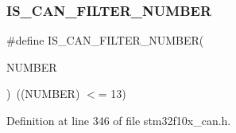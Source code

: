 \subsubsection{\texorpdfstring{I\+S\+\_\+\+C\+A\+N\+\_\+\+F\+I\+L\+T\+E\+R\+\_\+\+N\+U\+M\+B\+ER}{IS\_CAN\_FILTER\_NUMBER}}
{\footnotesize\ttfamily \#define I\+S\+\_\+\+C\+A\+N\+\_\+\+F\+I\+L\+T\+E\+R\+\_\+\+N\+U\+M\+B\+ER(\begin{DoxyParamCaption}\item[{}]{N\+U\+M\+B\+ER }\end{DoxyParamCaption})~((N\+U\+M\+B\+ER) $<$= 13)}



Definition at line 346 of file stm32f10x\+\_\+can.\+h.

